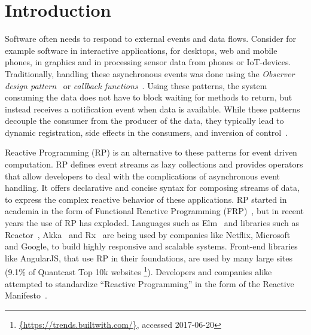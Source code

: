 \section{Introduction}

Software often needs to respond to external events and data flows.
Consider for example software in interactive applications, for desktops,
web and mobile phones, in graphics and in processing sensor data from
phones or IoT-devices.  Traditionally, handling these asynchronous
events was done using the \emph{Observer design pattern}~\cite{johnson1995design}
or \emph{callback functions}~\cite{gallaba2015don}.  Using these
patterns, the system consuming the data does not have to block waiting
for methods to return, but instead receives a notification event when
data is available.  While these patterns decouple the consumer from the
producer of the data, they typically lead to dynamic registration, side
effects in the consumers, and inversion of control~\cite{salvaneschi2014empirical,edwards2009coherent}.

Reactive Programming (RP) is an alternative to these patterns for event
driven computation.  RP defines event streams as lazy collections and
provides operators that allow developers to deal with the complications
of asynchronous event handling.  It offers declarative and concise
syntax for composing streams of data, to express the complex reactive
behavior of these applications.  RP started in academia in the form of
Functional Reactive Programming (FRP)~\cite{elliott1997functional,elliott2009push,czaplicki2013asynchronous,maier2010deprecating,meyerovich2009flapjax},
but in recent years the use of RP has exploded.  Languages such as Elm~\cite
{czaplicki2012elm} and libraries such as Reactor~\cite{Gutierrez2017},
Akka~\cite{klangakka} and Rx~\cite{meijer2010subject} are being used by
companies like Netflix, Microsoft and Google, to build highly responsive
and scalable systems.  Front-end libraries like AngularJS, that use RP
in their foundations, are used by many large sites (9.1\% of Quantcast
Top 10k websites%
\footnote{\url{{https://trends.builtwith.com/}}, accessed 2017-06-20}).
Developers and companies alike attempted to standardize ``Reactive
Programming'' in the form of the Reactive Manifesto~\cite{boner2014reactive}.


